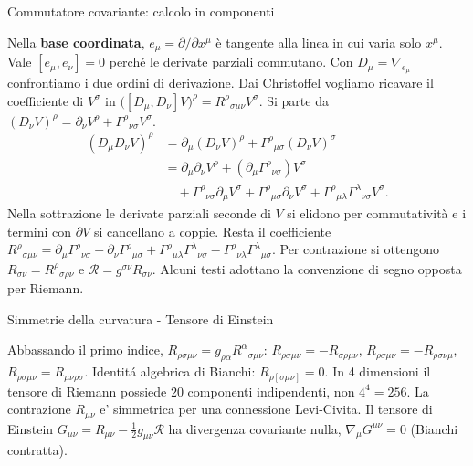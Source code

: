 \begin{frame}[t]{Commutatore covariante: calcolo in componenti}
\small\raggedright
Nella \textbf{base coordinata}, \(e_\mu=\partial/\partial x^\mu\) è tangente
alla linea in cui varia solo \(x^\mu\). Vale \([e_\mu,e_\nu]=0\) perché
le derivate parziali commutano.
Con \(D_\mu=\nabla_{e_\mu}\) confrontiamo i due ordini di derivazione.
Dai Christoffel vogliamo ricavare il coefficiente di \(V^\sigma\) in
\(\bigl([D_\mu,D_\nu]V\bigr)^\rho=R^\rho{}_{\sigma\mu\nu}V^\sigma\).
Si parte da \((D_\nu V)^\rho=\partial_\nu V^\rho+\Gamma^\rho{}_{\nu\sigma}V^\sigma\).
\[
\begin{aligned}
(D_\mu D_\nu V)^\rho
&=\partial_\mu(D_\nu V)^\rho+\Gamma^\rho{}_{\mu\sigma}(D_\nu V)^\sigma\\
&=\partial_\mu\partial_\nu V^\rho
  +(\partial_\mu\Gamma^\rho{}_{\nu\sigma})V^\sigma\\
&\quad+\Gamma^\rho{}_{\nu\sigma}\partial_\mu V^\sigma
  +\Gamma^\rho{}_{\mu\sigma}\partial_\nu V^\sigma
  +\Gamma^\rho{}_{\mu\lambda}\Gamma^\lambda{}_{\nu\sigma}V^\sigma.
\end{aligned}
\]
Nella sottrazione le derivate parziali seconde di \(V\) si elidono
per commutatività e i termini con \(\partial V\) si cancellano a coppie.
Resta il coefficiente $R^\rho{}_{\sigma\mu\nu}=\partial_\mu\Gamma^\rho{}_{\nu\sigma}-\partial_\nu\Gamma^\rho{}_{\mu\sigma}+\Gamma^\rho{}_{\mu\lambda}\Gamma^\lambda{}_{\nu\sigma}-\Gamma^\rho{}_{\nu\lambda}\Gamma^\lambda{}_{\mu\sigma}$.
Per contrazione si ottengono
\(R_{\sigma\nu}=R^\rho{}_{\sigma\rho\nu}\) e
\(\mathcal R=g^{\sigma\nu}R_{\sigma\nu}\).
Alcuni testi adottano la convenzione di segno opposta per Riemann.
\end{frame}

\begin{frame}[t]{Simmetrie della curvatura - Tensore di Einstein}\small\raggedright
Abbassando il primo indice, $R_{\rho\sigma\mu\nu}=g_{\rho\alpha}R^\alpha{}_{\sigma\mu\nu}$: $R_{\rho\sigma\mu\nu}=-R_{\sigma\rho\mu\nu}$, $R_{\rho\sigma\mu\nu}=-R_{\rho\sigma\nu\mu}$, $R_{\rho\sigma\mu\nu}=R_{\mu\nu\rho\sigma}$. Identit\'a algebrica di Bianchi: $R_{\rho[\sigma\mu\nu]}=0$.
In 4 dimensioni il tensore di Riemann possiede $20$ componenti indipendenti, non $4^4=256$.
\medskip
La contrazione $R_{\mu\nu}$ e' simmetrica per una connessione Levi-Civita. Il tensore di Einstein $G_{\mu\nu}=R_{\mu\nu}-\frac12g_{\mu\nu}\mathcal R$ ha divergenza covariante nulla, $\nabla_\mu G^{\mu\nu}=0$ (Bianchi contratta).
\end{frame}

